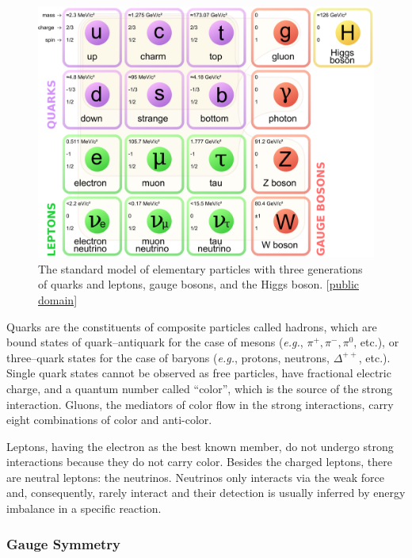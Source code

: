\begin{figure}[hb!!]
\centering
\includegraphics[scale=0.2]{figures/theory/standard.png}
\caption[Elementary particles in the standard model]{The standard model of elementary particles with three generations of quarks and leptons, gauge bosons, and the Higgs boson. [\href{http://tinyurl.com/loorj2q}{public domain}]}
\label{smplot}
\end{figure}

Quarks are the constituents of composite particles called hadrons, which are bound states of quark--antiquark for the case of mesons ({\it e.g.}, $\pi^+, \pi^-, \pi^0$, etc.), or three--quark states for the case of baryons ({\it e.g.}, protons, neutrons, $\Delta^{++}$, etc.). Single quark states cannot be observed as free particles, have fractional electric charge, and a quantum number called ``color'', which is the source of the strong interaction. Gluons, the mediators of color flow in the strong interactions, carry eight combinations of color and anti-color. 

Leptons, having the electron as the best known member, do not undergo strong interactions because they do not carry color. Besides the charged leptons, there are neutral leptons: the neutrinos. Neutrinos only interacts via the weak force and, consequently, rarely interact and their detection is usually inferred by energy imbalance in a specific reaction. 

\subsubsection*{Gauge Symmetry}

